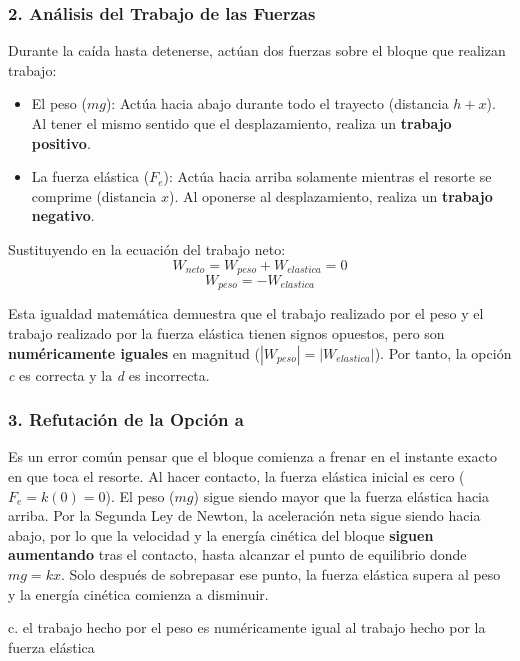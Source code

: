\documentclass[12pt, a4paper]{article}
\begin{document}
\subsubsection*{2. Análisis del Trabajo de las Fuerzas}
Durante la caída hasta detenerse, actúan dos fuerzas sobre el bloque que realizan trabajo:
\begin{itemize}
    \item El peso ($mg$): Actúa hacia abajo durante todo el trayecto (distancia $h + x$). Al tener el mismo sentido que el desplazamiento, realiza un \textbf{trabajo positivo}.
    \item La fuerza elástica ($F_e$): Actúa hacia arriba solamente mientras el resorte se comprime (distancia $x$). Al oponerse al desplazamiento, realiza un \textbf{trabajo negativo}.
\end{itemize}

Sustituyendo en la ecuación del trabajo neto:
$$W_{neto} = W_{peso} + W_{elastica} = 0$$
$$W_{peso} = -W_{elastica}$$

Esta igualdad matemática demuestra que el trabajo realizado por el peso y el trabajo realizado por la fuerza elástica tienen signos opuestos, pero son \textbf{numéricamente iguales} en magnitud ($|W_{peso}| = |W_{elastica}|$). Por tanto, la opción \textit{c} es correcta y la \textit{d} es incorrecta.

\subsubsection*{3. Refutación de la Opción a}
Es un error común pensar que el bloque comienza a frenar en el instante exacto en que toca el resorte. Al hacer contacto, la fuerza elástica inicial es cero ($F_e = k(0) = 0$). El peso ($mg$) sigue siendo mayor que la fuerza elástica hacia arriba. Por la Segunda Ley de Newton, la aceleración neta sigue siendo hacia abajo, por lo que la velocidad y la energía cinética del bloque \textbf{siguen aumentando} tras el contacto, hasta alcanzar el punto de equilibrio donde $mg = kx$. Solo después de sobrepasar ese punto, la fuerza elástica supera al peso y la energía cinética comienza a disminuir.

\begin{tcolorbox}[colback=green!5!white, colframe=green!50!black, title=Respuesta Correcta]
\centering \Large c. el trabajo hecho por el peso es numéricamente igual al trabajo hecho por la fuerza elástica
\end{tcolorbox}

\newpage
\end{document}
